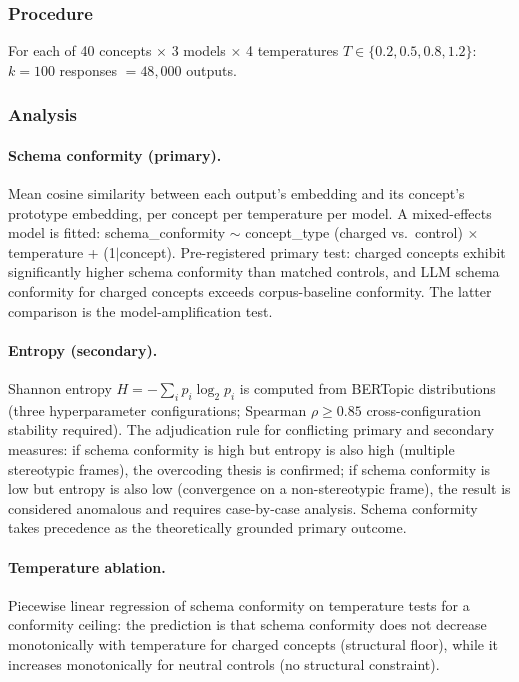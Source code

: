 \documentclass[12pt,a4paper]{article}
\begin{document}
\subsubsection{Procedure}

For each of 40 concepts $\times$ 3 models $\times$ 4 temperatures
$T \in \{0.2, 0.5, 0.8, 1.2\}$: $k = 100$ responses $= 48{,}000$ outputs.

\subsubsection{Analysis}

\paragraph{Schema conformity (primary).} Mean cosine similarity between each
output's embedding and its concept's prototype embedding, per concept per
temperature per model. A mixed-effects model is fitted: schema\_conformity
$\sim$ concept\_type (charged vs.\ control) $\times$ temperature +
(1$|$concept). Pre-registered primary test: charged concepts exhibit
significantly higher schema conformity than matched controls, and LLM
schema conformity for charged concepts exceeds corpus-baseline conformity.
The latter comparison is the model-amplification test.

\paragraph{Entropy (secondary).} Shannon entropy $H = -\sum_i p_i \log_2 p_i$
is computed from BERTopic distributions (three hyperparameter configurations;
Spearman $\rho \geq 0.85$ cross-configuration stability required).
The adjudication rule for conflicting primary and secondary measures: if
schema conformity is high but entropy is also high (multiple stereotypic
frames), the overcoding thesis is confirmed; if schema conformity is low
but entropy is also low (convergence on a non-stereotypic frame), the result
is considered anomalous and requires case-by-case analysis. Schema conformity
takes precedence as the theoretically grounded primary outcome.

\paragraph{Temperature ablation.} Piecewise linear regression of schema
conformity on temperature tests for a conformity ceiling: the prediction is
that schema conformity does not decrease monotonically with temperature for
charged concepts (structural floor), while it increases monotonically for
neutral controls (no structural constraint).
\end{document}
